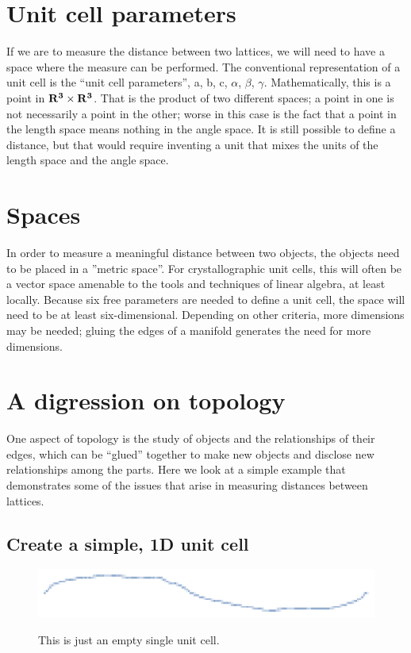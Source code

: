 \documentclass[preprint]{iucr}              %
\numberwithin{equation}{section}
\begin{document}
\section{Unit cell parameters}

\label{unitcells}
If we are to measure the distance between two lattices, we will need
to have a space where the measure can be performed. The conventional 
representation of a unit cell is the ``unit cell parameters'', 
a, b, c, $\alpha$, $\beta$, $\gamma$. Mathematically, this is a
point in $\bf{R^3 \times R^3}$. That is the product of two different spaces; a
point in one is not necessarily a point in the other; worse in this
case is the fact that a point in the length space means nothing
in the angle space. It is still possible to define a distance, but 
that would require inventing a unit that mixes the units of the length
space and the angle space.
		
\section{Spaces}
\label{spaces}

In order to measure a meaningful distance between two objects, the objects need to
be placed in a ”metric space”. For crystallographic unit cells, this will often be a
vector space amenable to the tools and techniques of
linear algebra, at least locally. Because six free parameters are needed to define a unit
cell, the space will need to be at least six-dimensional. Depending on
other criteria, more dimensions may be needed; gluing the edges of
a manifold generates the need for more dimensions.

\section{A digression on topology}
\label{topology}

One aspect of topology is the study of objects and the relationships
of their edges, which can be ``glued'' together to make new objects
and disclose new relationships among the parts. Here we look at a simple 
example that demonstrates some of the issues that arise
in measuring distances between lattices.

\subsection{Create a simple, 1D unit cell}
	
\begin{figure}
	\includegraphics[width=\textwidth]{line_1}
	\label{line_1}
	\caption{This is just an empty single unit cell.}
\end{figure}
\end{document}
